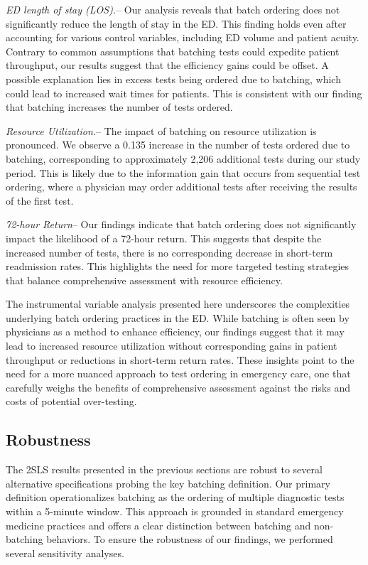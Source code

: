 \documentclass[,,nonblindrev]{informs}
\begin{document}
\emph{ED length of stay (LOS).}-- Our analysis reveals that batch
ordering does not significantly reduce the length of stay in the ED.
This finding holds even after accounting for various control variables,
including ED volume and patient acuity. Contrary to common assumptions
that batching tests could expedite patient throughput, our results
suggest that the efficiency gains could be offset. A possible
explanation lies in excess tests being ordered due to batching, which
could lead to increased wait times for patients. This is consistent with
our finding that batching increases the number of tests ordered.

\emph{Resource Utilization.}-- The impact of batching on resource
utilization is pronounced. We observe a 0.135 increase in the number of
tests ordered due to batching, corresponding to approximately 2,206
additional tests during our study period. This is likely due to the
information gain that occurs from sequential test ordering, where a
physician may order additional tests after receiving the results of the
first test.

\emph{72-hour Return}-- Our findings indicate that batch ordering does
not significantly impact the likelihood of a 72-hour return. This
suggests that despite the increased number of tests, there is no
corresponding decrease in short-term readmission rates. This highlights
the need for more targeted testing strategies that balance comprehensive
assessment with resource efficiency.

The instrumental variable analysis presented here underscores the
complexities underlying batch ordering practices in the ED. While
batching is often seen by physicians as a method to enhance efficiency,
our findings suggest that it may lead to increased resource utilization
without corresponding gains in patient throughput or reductions in
short-term return rates. These insights point to the need for a more
nuanced approach to test ordering in emergency care, one that carefully
weighs the benefits of comprehensive assessment against the risks and
costs of potential over-testing.

\hypertarget{robustness}{%
\subsection{Robustness}\label{robustness}}

The 2SLS results presented in the previous sections are robust to
several alternative specifications probing the key batching definition.
Our primary definition operationalizes batching as the ordering of
multiple diagnostic tests within a 5-minute window. This approach is
grounded in standard emergency medicine practices and offers a clear
distinction between batching and non-batching behaviors. To ensure the
robustness of our findings, we performed several sensitivity analyses.
\end{document}
